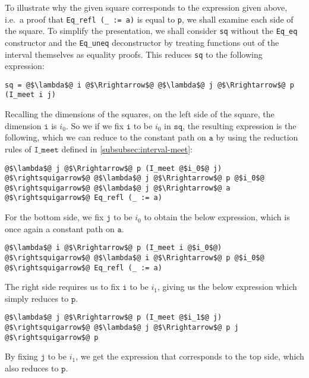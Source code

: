 \documentclass[12pt,twoside,maitrise]{dms}
\theoremstyle{definition}
\numberwithin{equation}{section}
\numberwithin{table}{chapter}
\numberwithin{figure}{chapter}
\newcommand\id[1] {\texttt{#1}}
\newcommand\fn[1] {\texttt{#1}}
\begin{document}
To illustrate why the given square corresponds to the expression given above,
i.e.\ a proof that \fn{Eq\_refl (\_ := a)} is equal to \id{p}, we shall examine
each side of the square. To simplify the presentation, we shall consider \id{sq}
without the \id{Eq\_eq} constructor and the \id{Eq\_uneq} deconstructor by
treating functions out of the interval themselves as equality proofs. This
reduces \id{sq} to the following expression:

\begin{verbatim}
sq = @$\lambda$@ i @$\Rrightarrow$@ @$\lambda$@ j @$\Rrightarrow$@ p (I_meet i j)
\end{verbatim}

Recalling the dimensions of the squares, on the left side of the square, the
dimension $\fn{i}$ is $i_0$. So we if we fix $\fn{i}$ to be $i_0$ in $\fn{sq}$,
the resulting expression is the following, which we can reduce to the constant
path on $\fn{a}$ by using the reduction rules of $\fn{I\_meet}$ defined in
\autoref{subsubsec:interval-meet}:

\begin{verbatim}
@$\lambda$@ j @$\Rrightarrow$@ p (I_meet @$i_0$@ j)
@$\rightsquigarrow$@ @$\lambda$@ j @$\Rrightarrow$@ p @$i_0$@
@$\rightsquigarrow$@ @$\lambda$@ j @$\Rrightarrow$@ a
@$\rightsquigarrow$@ Eq_refl (_ := a)
\end{verbatim}

For the bottom side, we fix $\fn{j}$ to be $i_0$ to obtain the below expression,
which is once again a constant path on $\fn{a}$.

\begin{verbatim}
@$\lambda$@ i @$\Rrightarrow$@ p (I_meet i @$i_0$@)
@$\rightsquigarrow$@ @$\lambda$@ i @$\Rrightarrow$@ p @$i_0$@
@$\rightsquigarrow$@ Eq_refl (_ := a)
\end{verbatim}

The right side requires us to fix $\fn{i}$ to be $i_1$, giving us the below
expression which simply reduces to $\fn{p}$.

\begin{verbatim}
@$\lambda$@ j @$\Rrightarrow$@ p (I_meet @$i_1$@ j)
@$\rightsquigarrow$@ @$\lambda$@ j @$\Rrightarrow$@ p j
@$\rightsquigarrow$@ p
\end{verbatim}

By fixing $\fn{j}$ to be $i_1$, we get the expression that corresponds to the top side, which also reduces to $\fn{p}$.
\end{document}
